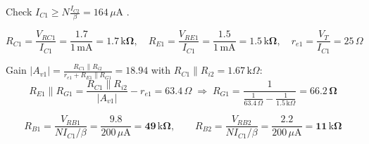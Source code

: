 \documentclass[11pt]{article}
\begin{document}
Check $I_{C1} \ge N\frac{I_{C2}}{\beta} = 164\,\mu \mathrm{A}$ \checkmark. 

\[R_{C1} = \frac{V_{RC1}}{I_{C1}} = \frac{1.7}{1\,\mathrm{m}\mathrm{A}} = \mathbf{1.7\,\mathrm{k}\Omega},\quad R_{E1} = \frac{V_{RE1}}{I_{C1}} = \frac{1.5}{1\,\mathrm{m}\mathrm{A}} = \mathbf{1.5\,\mathrm{k}\Omega},\quad r_{e1} = \frac{V_T}{I_{C1}} = 25\,\Omega\]

Gain $|A_{v1}| = \frac{R_{C1}\|R_{i2}}{r_{e1} + R_{E1}\|R_{G1}} = 18.94$ with $R_{C1}\|R_{i2} = 1.67\,\mathrm{k}\Omega$:\[R_{E1}\|R_{G1} = \frac{R_{C1}\|R_{i2}}{|A_{v1}|} - r_{e1} = 63.4\,\Omega \;\Rightarrow\; R_{G1} = \frac{1}{\frac{1}{63.4\,\Omega} - \frac{1}{1.5\,\mathrm{k}\Omega}} = \mathbf{66.2\,\Omega}\]

\[R_{B1} = \frac{V_{RB1}}{N I_{C1}/\beta} = \frac{9.8}{200\,\mu \mathrm{A}} = \mathbf{49\,\mathrm{k}\Omega},\qquad R_{B2} = \frac{V_{RB2}}{N I_{C1}/\beta} = \frac{2.2}{200\,\mu \mathrm{A}} = \mathbf{11\,\mathrm{k}\Omega}\]
\end{document}
